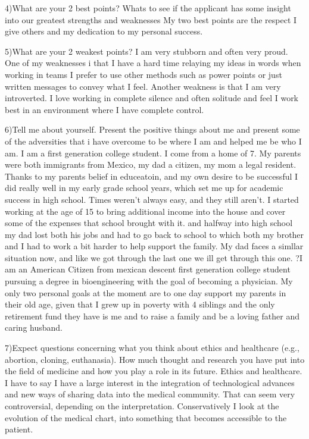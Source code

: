 \documentclass[12pt,a4paper,article]{memoir} %
\begin{document}
4)What are your 2 best points? Whats to see if the applicant has some insight into our greatest strengths and weaknesses
My two best points are the respect I give others and my dedication to my personal success.

5)What are your 2 weakest points?
I am very stubborn and often very proud.  
One of my weaknesses i that I have a hard time relaying my ideas in words when working in teams I prefer to use other methods such as power points or just written messages to convey what I feel.  Another weakness is that I am very introverted.  I love working in complete silence and often solitude and feel I work best in an environment where I have complete control.

6)Tell me about yourself. Present the positive things about me and present some of the adversities that i have overcome to be where I am and helped me be who I am.
I am a first generation college student. I come from a home of 7. My parents were both immigrants from Mexico, my dad a citizen, my mom a legal resident.  Thanks to my parents belief in educeatoin, and my own desire to be successful I did really well in my early grade school years, which set me up for academic success in high school.  Times weren't always easy, and they still aren't. I started working at the age of 15 to bring additional income into the house and cover some of the expenses that school brought with it.  and halfway into high school my dad lost both his jobs and had to go back to school to which both my brother and I had to work a bit harder to help support the family.  My dad faces a simllar situation now, and like we got through the last one we ill get through this one. ?I am an American Citizen from mexican descent first generation college student pursuing a degree in bioengineering with the goal of becoming a physician.  My only two personal goals at the moment are to one day support my parents in their old age, given that I grew up in poverty with 4 siblings and the only retirement fund they have is me and to raise a family and be a loving father and caring husband. 

7)Expect questions concerning what you think about ethics and healthcare (e.g., abortion, cloning, euthanasia). How much thought and research you have put into the field of medicine and how you play a role in its future.
Ethics and healthcare. I have to say I have a large interest in the integration of technological advances and new ways of sharing data into the medical community.  That can seem very controversial, depending on the interpretation.  Conservatively I look at the evolution of the medical chart, into something that becomes accessible to the patient.  
\end{document}
